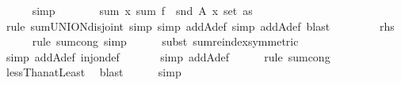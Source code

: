 \begin{isabellebody}
\ \ \ \ \isamarkupfalse%
\ simp\isanewline
\ \ \isamarkupfalse%
\ \isamarkupfalse%
\ {\isachardoublequoteopen}{\isachardot}{\kern0pt}{\isachardot}{\kern0pt}{\isachardot}{\kern0pt}\ {\isacharequal}{\kern0pt}\ sum\ {\isacharparenleft}{\kern0pt}{\isasymlambda}x{\isachardot}{\kern0pt}\ sum\ {\isacharparenleft}{\kern0pt}f\ {\isasymcirc}\ snd{\isacharparenright}{\kern0pt}\ {\isacharparenleft}{\kern0pt}A\ x{\isacharparenright}{\kern0pt}{\isacharparenright}{\kern0pt}\ {\isacharparenleft}{\kern0pt}set\ as{\isacharparenright}{\kern0pt}{\isachardoublequoteclose}\isanewline
\ \ \ \ \isamarkupfalse%
\ {\isacharparenleft}{\kern0pt}rule\ sum{\isachardot}{\kern0pt}UNION{\isacharunderscore}{\kern0pt}disjoint{\isacharcomma}{\kern0pt}\ simp{\isacharcomma}{\kern0pt}\ simp\ add{\isacharcolon}{\kern0pt}A{\isacharunderscore}{\kern0pt}def{\isacharcomma}{\kern0pt}\ simp\ add{\isacharcolon}{\kern0pt}A{\isacharunderscore}{\kern0pt}def{\isacharcomma}{\kern0pt}\ blast{\isacharparenright}{\kern0pt}\ \isanewline
\ \ \isamarkupfalse%
\ \isamarkupfalse%
\ {\isachardoublequoteopen}{\isachardot}{\kern0pt}{\isachardot}{\kern0pt}{\isachardot}{\kern0pt}\ {\isacharequal}{\kern0pt}\ {\isacharquery}{\kern0pt}rhs{\isachardoublequoteclose}\isanewline
\ \ \ \ \isamarkupfalse%
\ {\isacharparenleft}{\kern0pt}rule\ sum{\isachardot}{\kern0pt}cong{\isacharcomma}{\kern0pt}\ simp{\isacharparenright}{\kern0pt}\isanewline
\ \ \ \ \isamarkupfalse%
\ {\isacharparenleft}{\kern0pt}subst\ sum{\isachardot}{\kern0pt}reindex{\isacharbrackleft}{\kern0pt}symmetric{\isacharbrackright}{\kern0pt}{\isacharparenright}{\kern0pt}\isanewline
\ \ \ \ \ \isamarkupfalse%
\ {\isacharparenleft}{\kern0pt}simp\ add{\isacharcolon}{\kern0pt}A{\isacharunderscore}{\kern0pt}def\ inj{\isacharunderscore}{\kern0pt}on{\isacharunderscore}{\kern0pt}def{\isacharparenright}{\kern0pt}\ \isanewline
\ \ \ \ \isamarkupfalse%
\ {\isacharparenleft}{\kern0pt}simp\ add{\isacharcolon}{\kern0pt}A{\isacharunderscore}{\kern0pt}def{\isacharparenright}{\kern0pt}\isanewline
\ \ \ \ \isamarkupfalse%
\ {\isacharparenleft}{\kern0pt}rule\ sum{\isachardot}{\kern0pt}cong{\isacharparenright}{\kern0pt}\isanewline
\ \ \ \ \isamarkupfalse%
\ lessThan{\isacharunderscore}{\kern0pt}atLeast{}\ \isamarkupfalse%
\ blast\isanewline
\ \ \ \ \isamarkupfalse%
\ simp\isanewline
\ \ \isamarkupfalse%
\ \isamarkupfalse%

\end{isabellebody}
